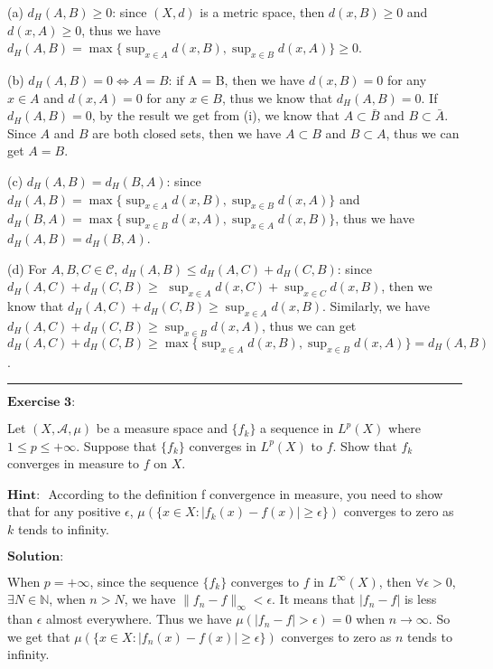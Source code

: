 \documentclass[12pt]{article}
\begin{document}
(a) $d_{H}(A, B) \geq 0$: since $(X, d)$ is a metric space, then $d(x, B) \geq 0$ and $d(x, A) \geq 0$, thus we have $d_{H}(A, B) = \max \{\sup_{x \in A} d(x, B), \sup_{x \in B} d(x, A) \} \geq 0$.

(b) $d_{H}(A, B) = 0 \iff A = B$: if A = B, then we have $d(x, B) = 0$ for any $x \in A$ and $d(x, A) = 0$ for any $x \in B$, thus we know that $d_{H}(A, B) = 0$. If $d_{H}(A, B) = 0$, by the result we get from (i), we know that $A \subset \bar{B}$ and $B \subset \bar{A}$. Since $A$ and $B$ are both closed sets, then we have $A \subset B$ and $B \subset A$, thus we can get $A = B$.

(c) $d_{H}(A, B) = d_{H}(B, A)$: since $d_{H}(A, B) = \max \{\sup_{x \in A} d(x, B), \sup_{x \in B} d(x, A) \}$ and $d_{H}(B, A) = \max \{\sup_{x \in B} d(x, A), \sup_{x \in A} d(x, B) \}$, thus we have $d_{H}(A, B) = d_{H}(B, A)$.

(d) For $A, B, C \in \mathcal{C}$, $d_{H}(A, B) \leq d_{H}(A, C) + d_{H}(C, B)$: since $d_{H}(A, C) + d_{H}(C, B) \geq $ $\sup_{x \in A} d(x, C) + \sup_{x \in C} d(x, B)$, then we know that $d_{H}(A, C) + d_{H}(C, B) \geq \sup_{x \in A} d(x, B)$. Similarly, we have $d_{H}(A, C) + d_{H}(C, B) \geq \sup_{x \in B} d(x, A)$, thus we can get $d_{H}(A, C) + d_{H}(C, B) \geq \max \{\sup_{x \in A} d(x, B), \sup_{x \in B} d(x, A) \} = d_{H}(A, B)$.

\vspace{8pt}

\noindent\rule[0.25\baselineskip]{\textwidth}{0.5pt}

$\textbf{Exercise 3:}$

Let $(X, \mathcal{A}, \mu)$ be a measure space and $\{f_{k}\}$ a sequence in $L^{p}(X)$ where $1 \leq p \leq + \infty$. Suppose that $\{f_{k}\}$ converges in $L^{p}(X)$ to $f$. Show that $f_{k}$ converges in measure to $f$ on $X$.

$\textbf{Hint: }$ According to the definition f convergence in measure, you need to show that for any positive $\epsilon$, $\mu(\{x \in X: |f_{k}(x) - f(x)| \geq \epsilon \})$ converges to zero as $k$ tends to infinity.

\vspace{8pt}
$\textbf{Solution:}$

When $p = + \infty$, since the sequence $\{f_{k}\}$ converges to $f$ in $L^{\infty} (X)$, then $\forall \epsilon > 0$, $\exists N \in \mathbb{N}$, when $n > N$, we have $\|f_{n} - f\|_{\infty} < \epsilon$. It means that $|f_{n} - f|$ is less than $\epsilon$ almost everywhere. Thus we have $\mu(|f_{n} - f| > \epsilon) = 0$ when $n \to \infty$. So we get that $\mu(\{x \in X: |f_{n}(x) - f(x)| \geq \epsilon \})$ converges to zero as $n$ tends to infinity.
\end{document}

